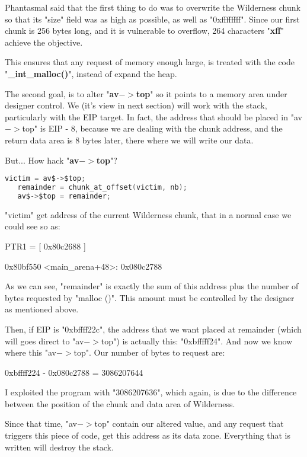 \documentclass[12pt]{article}
\begin{document}
Phantasmal said that the first thing to do was to overwrite the
Wilderness chunk so that its "size" field was as high as possible,
as well as "0xffffffff". Since our first chunk is 256 bytes long,
and it is vulnerable to overflow, 264 characters "\textbf{xff}" achieve the
objective.
\newline


This ensures that any request of memory enough large, is treated with
the code "\textbf{\_int\_malloc()}", instead of expand the heap.
\newline


The second goal, is to alter "\textbf{av$->$top}" so it points to a memory area under
designer control. We (it's view in next section) will work with the stack,
particularly with the EIP target. In fact, the address that should be
placed in "av$->$top" is EIP - 8, because we are dealing with the chunk
address, and the return data area is 8 bytes later, there where we will
write our data.

But... How hack "\textbf{av$->$top}"?
\begin{lstlisting}[language=C]
   victim = av$->$top;
   remainder = chunk_at_offset(victim, nb);
   av$->$top = remainder;
\end{lstlisting}
"victim" get address of the current Wilderness chunk, that in a normal
case we could see so as: 

\begin{verbnobox}[\small]
   PTR1 = [ 0x80c2688 ]

   0x80bf550 <main_arena+48>:   0x080c2788
\end{verbnobox}

As we can see, "remainder" is exactly the sum of this address plus the
number of bytes requested by "malloc ()". This amount must be controlled
by the designer as mentioned above.
\newline


Then, if EIP is "0xbffff22c", the address that we want placed at remainder
(which will goes direct to "av$->$top") is actually this: "0xbfffff24". And
now we know where this "av$->$top". Our number of bytes to request are:
\begin{verbnobox}[\small]
    0xbffff224 - 0x080c2788 = 3086207644
\end{verbnobox}
I exploited the program with "3086207636", which again, is due to the
difference between the position of the chunk and data area of Wilderness.
\newline


Since that time, "av$->$top" contain our altered value, and any request that
triggers this piece of code, get this address as its data zone. Everything
that is written will destroy the stack.
\end{document}
